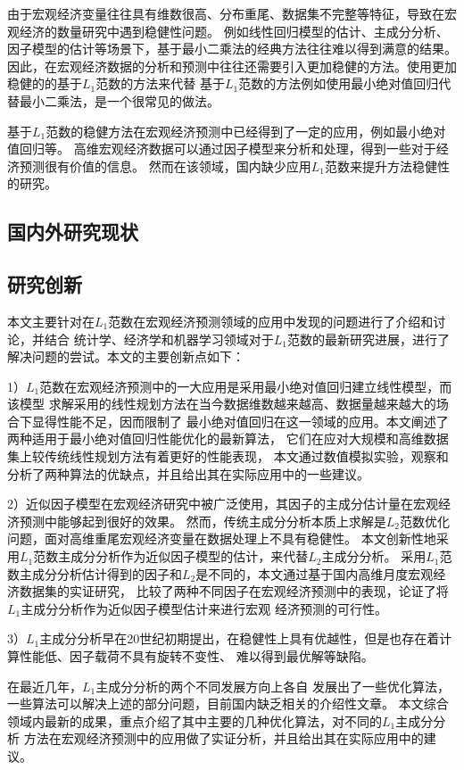 由于宏观经济变量往往具有维数很高、分布重尾、数据集不完整等特征，导致在宏观经济的数量研究中遇到稳健性问题。
例如线性回归模型的估计、主成分分析、因子模型的估计等场景下，基于最小二乘法的经典方法往往难以得到满意的结果。
因此，在宏观经济数据的分析和预测中往往还需要引入更加稳健的方法。使用更加稳健的的基于$L_1$范数的方法来代替
基于$L_1$范数的方法例如使用最小绝对值回归代替最小二乘法，是一个很常见的做法。

基于$L_1$范数的稳健方法在宏观经济预测中已经得到了一定的应用，例如最小绝对值回归等。
高维宏观经济数据可以通过因子模型来分析和处理，得到一些对于经济预测很有价值的信息。
然而在该领域，国内缺少应用$L_1$范数来提升方法稳健性的研究。

\subsection{国内外研究现状}

\subsection{研究创新}
本文主要针对在$L_1$范数在宏观经济预测领域的应用中发现的问题进行了介绍和讨论，并结合
统计学、经济学和机器学习领域对于$L_1$范数的最新研究进展，进行了解决问题的尝试。本文的主要创新点如下：

1）$L_1$范数在宏观经济预测中的一大应用是采用最小绝对值回归建立线性模型，而该模型
求解采用的线性规划方法在当今数据维数越来越高、数据量越来越大的场合下显得性能不足，因而限制了
最小绝对值回归在这一领域的应用。本文阐述了两种适用于最小绝对值回归性能优化的最新算法，
它们在应对大规模和高维数据集上较传统线性规划方法有着更好的性能表现，
本文通过数值模拟实验，观察和分析了两种算法的优缺点，并且给出其在实际应用中的一些建议。

2）近似因子模型在宏观经济研究中被广泛使用，其因子的主成分估计量在宏观经济预测中能够起到很好的效果。
然而，传统主成分分析本质上求解是$L_2$范数优化问题，面对高维重尾宏观经济变量在数据处理上不具有稳健性。
本文创新性地采用$L_1$范数主成分分析作为近似因子模型的估计，来代替$L_2$主成分分析。
采用$L_1$范数主成分分析估计得到的因子和$L_2$是不同的，本文通过基于国内高维月度宏观经济数据集的实证研究，
比较了两种不同因子在宏观经济预测中的表现，论证了将$L_1$主成分分析作为近似因子模型估计来进行宏观
经济预测的可行性。

3）$L_1$主成分分析早在20世纪初期提出，在稳健性上具有优越性，但是也存在着计算性能低、因子载荷不具有旋转不变性、
难以得到最优解等缺陷。

在最近几年，$L_1$主成分分析的两个不同发展方向上各自
发展出了一些优化算法，一些算法可以解决上述的部分问题，目前国内缺乏相关的介绍性文章。
本文综合领域内最新的成果，重点介绍了其中主要的几种优化算法，对不同的$L_1$主成分分析
方法在宏观经济预测中的应用做了实证分析，并且给出其在实际应用中的建议。

